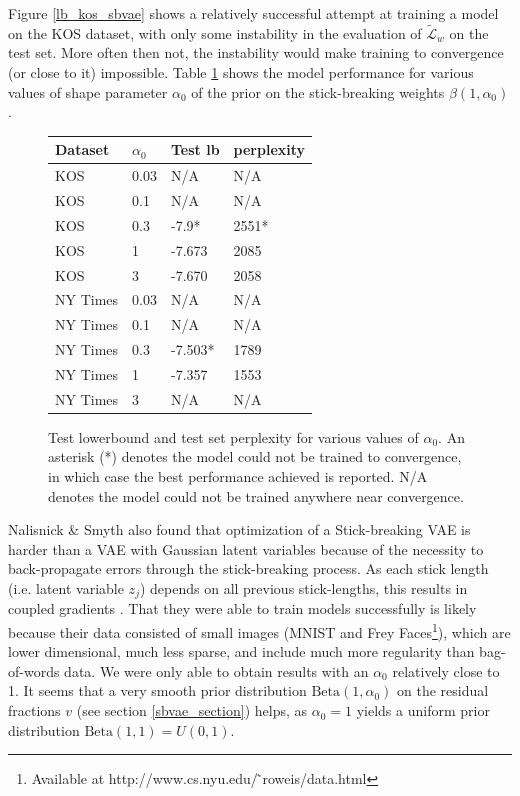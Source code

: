 \documentclass{report}
\begin{document}
	Figure \ref{lb_kos_sbvae} shows a relatively successful attempt at training a model on the KOS dataset, with only some instability in the evaluation of $\tilde{\mathcal{L}}_w$ on the test set. More often then not, the instability would make training to convergence (or close to it) impossible. Table \ref{sb_res_table} shows the model performance for various values of shape parameter $\alpha_0$ of the prior on the stick-breaking weights $\beta(1,\alpha_0)$. \\
	\begin{figure}%
		\centering
		\begin{tabular}{l|l|l|l}
			Dataset 	& $\alpha_0$ & Test lb 	& perplexity  \\ \hline
			KOS 		& 0.03		& N/A		&  N/A	\\
			KOS 		& 0.1		& N/A		&  N/A	\\
			KOS 		& 0.3		& -7.9*		&  2551*\\
			KOS 		& 1			& -7.673	&  2085	\\
			KOS 		& 3			& -7.670	&  2058	\\ \hline
			NY Times 	& 0.03		& N/A		& N/A	\\
			NY Times 	& 0.1		& N/A		& N/A	\\
			NY Times 	& 0.3		& -7.503*	& 1789	\\
			NY Times 	& 1			& -7.357	& 1553	\\
			NY Times 	& 3			& N/A		& N/A	\\
		\end{tabular}
		\caption{Test lowerbound and test set perplexity for various values of $\alpha_0$. An asterisk (*) denotes the model could not be trained to convergence, in which case the best performance achieved is reported. N/A denotes the model could not be trained anywhere near convergence.}
		\label{sb_res_table}
	\end{figure}


	Nalisnick \& Smyth \cite{nalisnick2016deep} also found that optimization of a Stick-breaking VAE is harder than a VAE with Gaussian latent variables because of the necessity to back-propagate errors through the stick-breaking process. As each stick length (i.e. latent variable $z_j$) depends on all previous stick-lengths, this results in coupled gradients \cite{nalisnick2016deep}. That they were able to train models successfully is likely because their data consisted of small images (MNIST and Frey Faces\footnote{Available at http://www.cs.nyu.edu/ ̃roweis/data.html}), which are lower dimensional, much less sparse, and include much more regularity than bag-of-words data. We were only able to obtain results with an $\alpha_0$ relatively close to 1. It seems that a very smooth prior distribution $\text{Beta}(1,\alpha_0)$ on the residual fractions $v$ (see section \ref{sbvae_section}) helps, as $\alpha_0=1$ yields a uniform prior distribution $\text{Beta}(1,1) = U(0,1)$.
\end{document}
